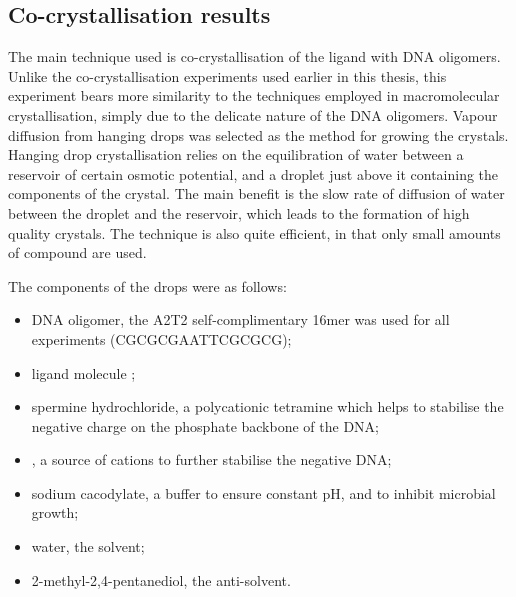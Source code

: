 \begin{refsection}

\subsection{Co-crystallisation results}
The main technique used is co-crystallisation of the ligand with DNA oligomers.
Unlike the co-crystallisation experiments used earlier in this thesis, this experiment bears more similarity to the techniques employed in macromolecular crystallisation, simply due to the delicate nature of the DNA oligomers.
Vapour diffusion from hanging drops was selected as the method for growing the crystals.
Hanging drop crystallisation relies on the equilibration of water between a reservoir of certain osmotic potential, and a droplet just above it containing the components of the crystal.
The main benefit is the slow rate of diffusion of water between the droplet and the reservoir, which leads to the formation of high quality crystals.
The technique is also quite efficient, in that only small amounts of compound are used.

The components of the drops were as follows:

\begin{itemize}
    \item DNA oligomer, the A2T2 self-complimentary 16mer was used for all experiments (CGCGCGAATTCGCGCG);
    \item ligand molecule ;
    \item spermine hydrochloride, a polycationic tetramine which helps to stabilise the negative charge on the phosphate backbone of the DNA;\@
    \item {}, a source of  cations to further stabilise the negative DNA;\@
    \item sodium cacodylate, a buffer to ensure constant pH, and to inhibit microbial growth;
    \item water, the solvent;
    \item 2-methyl-2,4-pentanediol, the anti-solvent.
\end{itemize}


\end{refsection}
